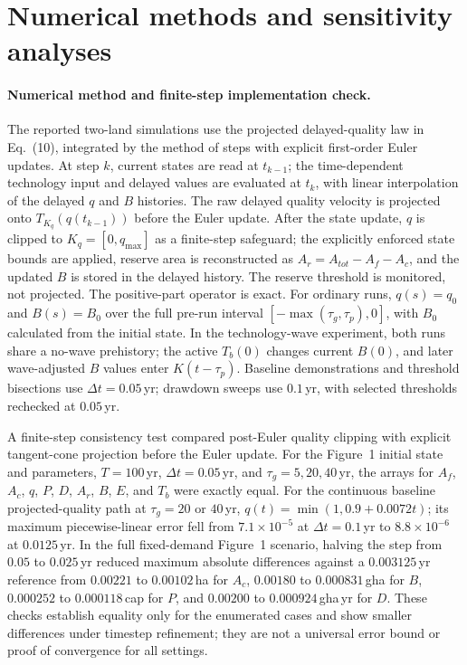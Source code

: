\documentclass[11pt,a4paper]{article}
\begin{document}
\section{Numerical methods and sensitivity analyses}\label{si:numerics}

\paragraph{Numerical method and finite-step implementation check.} The reported two-land simulations use the projected delayed-quality law in Eq.~(10), integrated by the method of steps with explicit first-order Euler updates. At step $k$, current states are read at $t_{k-1}$; the time-dependent technology input and delayed values are evaluated at $t_k$, with linear interpolation of the delayed $q$ and $B$ histories. The raw delayed quality velocity is projected onto $T_{K_q}(q(t_{k-1}))$ before the Euler update. After the state update, $q$ is clipped to $K_q=[0,q_{\max}]$ as a finite-step safeguard; the explicitly enforced state bounds are applied, reserve area is reconstructed as $A_r=A_{tot}-A_f-A_c$, and the updated $B$ is stored in the delayed history. The reserve threshold is monitored, not projected. The positive-part operator is exact. For ordinary runs, $q(s)=q_0$ and $B(s)=B_0$ over the full pre-run interval $[-\max(\tau_g,\tau_p),0]$, with $B_0$ calculated from the initial state. In the technology-wave experiment, both runs share a no-wave prehistory; the active $T_b(0)$ changes current $B(0)$, and later wave-adjusted $B$ values enter $K(t-\tau_p)$. Baseline demonstrations and threshold bisections use $\Delta t=0.05$\,yr; drawdown sweeps use $0.1$\,yr, with selected thresholds rechecked at $0.05$\,yr.

A finite-step consistency test compared post-Euler quality clipping with explicit tangent-cone projection before the Euler update. For the Figure~1 initial state and parameters, $T=100$\,yr, $\Delta t=0.05$\,yr, and $\tau_g=5,20,40$\,yr, the arrays for $A_f$, $A_c$, $q$, $P$, $D$, $A_r$, $B$, $E$, and $T_b$ were exactly equal. For the continuous baseline projected-quality path at $\tau_g=20$ or $40$\,yr, $q(t)=\min(1,0.9+0.0072t)$; its maximum piecewise-linear error fell from $7.1\times10^{-5}$ at $\Delta t=0.1$\,yr to $8.8\times10^{-6}$ at $0.0125$\,yr. In the full fixed-demand Figure~1 scenario, halving the step from $0.05$ to $0.025$\,yr reduced maximum absolute differences against a $0.003125$\,yr reference from $0.00221$ to $0.00102$\,ha for $A_c$, $0.00180$ to $0.000831$\,gha for $B$, $0.000252$ to $0.000118$\,cap for $P$, and $0.00200$ to $0.000924$\,gha\,yr for $D$. These checks establish equality only for the enumerated cases and show smaller differences under timestep refinement; they are not a universal error bound or proof of convergence for all settings.
\end{document}
